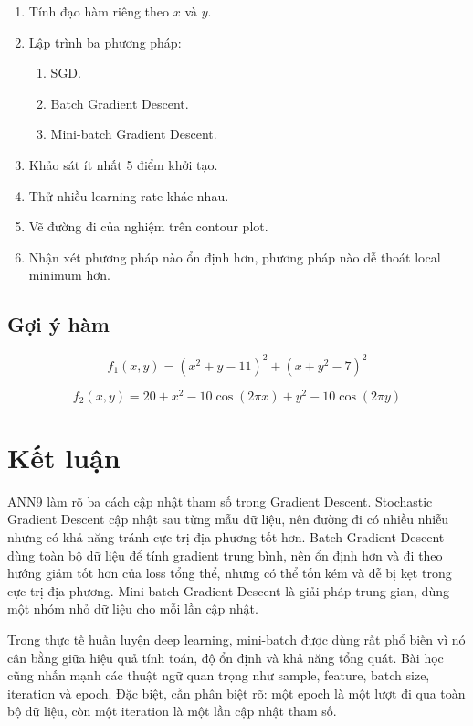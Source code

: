 \begin{enumerate}
    \item Tính đạo hàm riêng theo $x$ và $y$.
    \item Lập trình ba phương pháp:
    \begin{enumerate}
        \item SGD.
        \item Batch Gradient Descent.
        \item Mini-batch Gradient Descent.
    \end{enumerate}
    \item Khảo sát ít nhất 5 điểm khởi tạo.
    \item Thử nhiều learning rate khác nhau.
    \item Vẽ đường đi của nghiệm trên contour plot.
    \item Nhận xét phương pháp nào ổn định hơn, phương pháp nào dễ thoát local minimum hơn.
\end{enumerate}

\subsection*{Gợi ý hàm}

\[
    f_1(x,y)
    =
    (x^2+y-11)^2
    +
    (x+y^2-7)^2
\]

\[
    f_2(x,y)
    =
    20
    +
    x^2
    -
    10\cos(2\pi x)
    +
    y^2
    -
    10\cos(2\pi y)
\]

\section*{Kết luận}

ANN9 làm rõ ba cách cập nhật tham số trong Gradient Descent. Stochastic Gradient Descent cập nhật sau từng mẫu dữ liệu, nên đường đi có nhiều nhiễu nhưng có khả năng tránh cực trị địa phương tốt hơn. Batch Gradient Descent dùng toàn bộ dữ liệu để tính gradient trung bình, nên ổn định hơn và đi theo hướng giảm tốt hơn của loss tổng thể, nhưng có thể tốn kém và dễ bị kẹt trong cực trị địa phương. Mini-batch Gradient Descent là giải pháp trung gian, dùng một nhóm nhỏ dữ liệu cho mỗi lần cập nhật.

Trong thực tế huấn luyện deep learning, mini-batch được dùng rất phổ biến vì nó cân bằng giữa hiệu quả tính toán, độ ổn định và khả năng tổng quát. Bài học cũng nhấn mạnh các thuật ngữ quan trọng như sample, feature, batch size, iteration và epoch. Đặc biệt, cần phân biệt rõ: một epoch là một lượt đi qua toàn bộ dữ liệu, còn một iteration là một lần cập nhật tham số.

